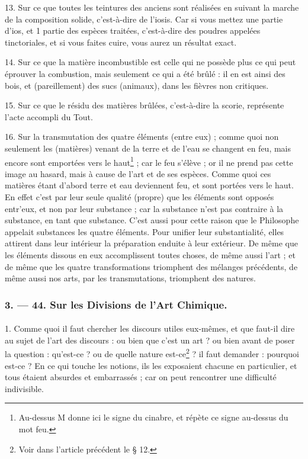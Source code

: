 \documentclass[a4paper, 11pt, oneside, polutonikogreek, french]{article}
\begin{document}
13. Sur ce que toutes les teintures des anciens sont réalisées en suivant la marche de la composition solide, c'est-à-dire de l'iosis. Car si vous mettez une partie d'ios, et 1 partie des espèces traitées, c'est-à-dire des poudres appelées tinctoriales, et si vous faites cuire, vous aurez un résultat exact.

14. Sur ce que la matière incombustible est celle qui ne possède plus ce qui peut éprouver la combustion, mais seulement ce qui a été brûlé : il en est ainsi des bois, et (pareillement) des sucs (animaux), dans les fièvres non critiques.

15. Sur ce que le résidu des matières brûlées, c'est-à-dire la scorie, représente l'acte accompli du Tout.

16. Sur la transmutation des quatre éléments (entre eux) ; comme quoi non seulement les (matières) venant de la terre et de l'eau se changent en feu, mais encore sont emportées vers le haut\footnote{Au-dessus M donne ici le signe du cinabre, et répète ce signe au-dessus du mot feu.} ; car le feu s'élève ; or il ne prend pas cette image au hasard, mais à cause de l'art et de ses espèces. Comme quoi ces matières étant d'abord terre et eau deviennent feu, et sont portées vers le haut. En effet c'est par leur seule qualité (propre) que les éléments sont opposés entr'eux, et non par leur substance ; car la substance n'est pas contraire à la substance, en tant que substance. C'est aussi pour cette raison que le Philosophe appelait substances les quatre éléments. Pour unifier leur substantialité, elles attirent dans leur intérieur la préparation enduite à leur extérieur. De même que les éléments dissous en eux accomplissent toutes choses, de même aussi l'art ; et de même que les quatre transformations triomphent des mélanges précédents, de même aussi nos arts, par les transmutations, triomphent des natures.

\bigskip
\centerline{\EightStarTaper}
\centerline{\EightStarTaper\EightStarTaper}
\bigskip

\subsubsection{3. --- 44. Sur les Divisions de l'Art Chimique.}
\paragraph{}
1. Comme quoi il faut chercher les discours utiles eux-mêmes, et que faut-il dire au sujet de l'art des discours : ou bien que c'est un art ? ou bien avant de poser la question : qu'est-ce ? ou de quelle nature est-ce\footnote{Voir dans l'article précédent le § 12.} ? il faut demander : pourquoi est-ce ? En ce qui touche les notions, ils les exposaient chacune en particulier, et tous étaient absurdes et embarrassés ; car on peut rencontrer une difficulté indivisible.
\end{document}
